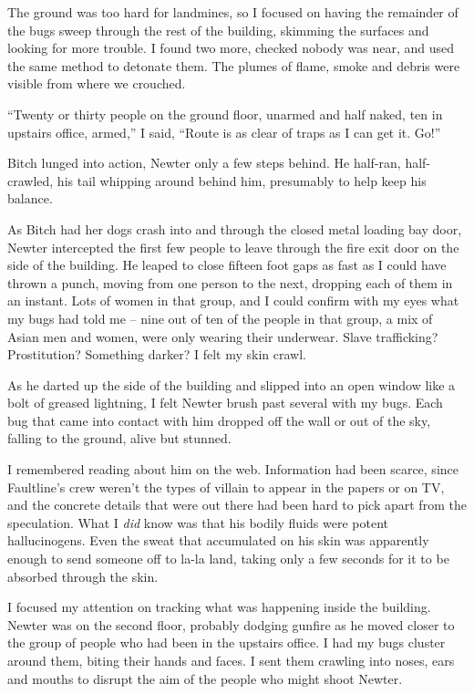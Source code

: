 The ground was too hard for landmines, so I focused on having the remainder of the bugs sweep through the rest of the building, skimming the surfaces and looking for more trouble.  I found two more, checked nobody was near, and used the same method to detonate them.  The plumes of flame, smoke and debris were visible from where we crouched.



``Twenty or thirty people on the ground floor, unarmed and half naked, ten in upstairs office, armed,'' I said, ``Route is as clear of traps as I can get it.  Go!''



Bitch lunged into action, Newter only a few steps behind.  He half-ran, half-crawled, his tail whipping around behind him, presumably to help keep his balance.



As Bitch had her dogs crash into and through the closed metal loading bay door, Newter intercepted the first few people to leave through the fire exit door on the side of the building.  He leaped to close fifteen foot gaps as fast as I could have thrown a punch, moving from one person to the next, dropping each of them in an instant.  Lots of women in that group, and I could confirm with my eyes what my bugs had told me – nine out of ten of the people in that group, a mix of Asian men and women, were only wearing their underwear.  Slave trafficking?  Prostitution?  Something darker?  I felt my skin crawl.



As he darted up the side of the building and slipped into an open window like a bolt of greased lightning, I felt Newter brush past several with my bugs.  Each bug that came into contact with him dropped off the wall or out of the sky, falling to the ground, alive but stunned.



I remembered reading about him on the web.  Information had been scarce, since Faultline's crew weren't the types of villain to appear in the papers or on TV, and the concrete details that were out there had been hard to pick apart from the speculation.  What I \emph{did} know was that his bodily fluids were potent hallucinogens.  Even the sweat that accumulated on his skin was apparently enough to send someone off to la-la land, taking only a few seconds for it to be absorbed through the skin.



I focused my attention on tracking what was happening inside the building.  Newter was on the second floor, probably dodging gunfire as he moved closer to the group of people who had been in the upstairs office.  I had my bugs cluster around them, biting their hands and faces.  I sent them crawling into noses, ears and mouths to disrupt the aim of the people who might shoot Newter.



